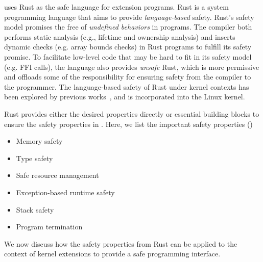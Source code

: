 
\projname{} uses Rust as the safe language for extension programs.
Rust is a system programming language that aims to provide
    \emph{language-based} safety.
Rust's safety model promises the free of \emph{undefined behaviors} in programs.
The compiler both performs static analysis (e.g., lifetime and ownership
    analysis) and inserts dynamic checks (e.g. array bounds checks) in
    Rust programs to fulfill its safety promise.
To facilitate low-level code that may be hard to fit in its safety model (e.g. FFI calls),
    the language also provides \emph{unsafe} Rust, which is more permissive and
    offloads some of the responsibility for ensuring safety from the compiler
    to the programmer.
The language-based safety of Rust under kernel contexts has been explored by
    previous works~\cite{redleaf,theseus}, and is incorporated into the Linux
    kernel.

Rust provides either the desired properties directly or
    essential building blocks to ensure the safety properties in \projname{}.
Here, we list the important safety properties ()
\begin{itemize}
    \item Memory safety
    \item Type safety
    \item Safe resource management
    \item Exception-based runtime safety
    \item Stack safety
    \item Program termination
\end{itemize}


We now discuss how the safety properties from Rust can be applied to the
    context of kernel extensions to provide a safe programming interface.

